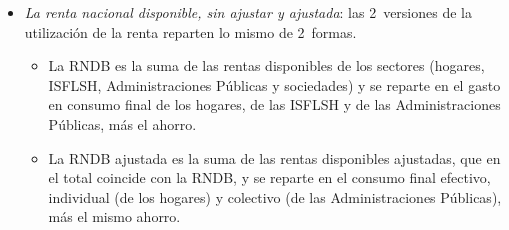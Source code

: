 \documentclass[11pt]{article}
\begin{document}
\begin{itemize}
\item \emph{La renta nacional disponible, sin ajustar y ajustada}: las 2~versiones de la utilización de la renta reparten lo mismo de 2~formas.
  \begin{itemize}
  \item La RNDB es la suma de las rentas disponibles de los sectores (hogares, ISFLSH, Administraciones Públicas y sociedades) y se reparte en el gasto en consumo final de los hogares, de las ISFLSH y de las Administraciones Públicas, más el ahorro.
  \item La RNDB ajustada es la suma de las rentas disponibles ajustadas, que en el total coincide con la RNDB, y se reparte en el consumo final efectivo, individual (de los hogares) y colectivo (de las Administraciones Públicas), más el mismo ahorro.
  \end{itemize}
\end{itemize}
\end{document}
